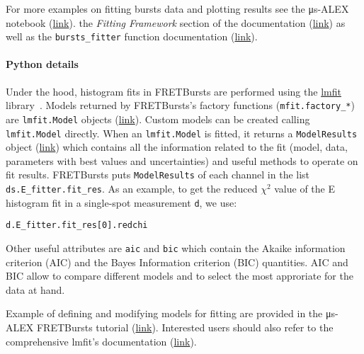 For more examples on fitting bursts data and plotting results see the
μs-ALEX notebook (\href{http://nbviewer.jupyter.org/github/tritemio/FRETBursts_notebooks/blob/master/notebooks/FRETBursts%20-%20us-ALEX%20smFRET%20burst%20analysis.ipynb}{link}).
the \textit{Fitting Framework} section of the documentation 
(\href{http://fretbursts.readthedocs.org/en/latest/fit.html}{link})
as well as the \verb|bursts_fitter| function documentation
(\href{http://fretbursts.readthedocs.org/en/latest/plugins.html#fretbursts.burstlib_ext.bursts_fitter}{link}).

\paragraph{Python details}
Under the hood, histogram fits in FRETBursts are performed using the
\href{http://lmfit.github.io/lmfit-py/}{lmfit} library~\cite{lmfit}.
Models returned by FRETBursts's factory functions (\verb|mfit.factory_*|) 
are \verb|lmfit.Model| objects (\href{https://lmfit.github.io/lmfit-py/model.html}{link}).
Custom models can be created calling \verb|lmfit.Model| directly.
When an \verb|lmfit.Model| is fitted, it returns a \verb|ModelResults| object 
(\href{https://lmfit.github.io/lmfit-py/model.html#the-modelresult-class}{link})
which contains all the information related to the fit (model, data, 
parameters with best values and uncertainties) and useful methods to operate on fit results. 
FRETBursts puts \verb|ModelResults| of each channel in the list 
\verb|ds.E_fitter.fit_res|.
As an example, to get the reduced $\chi^2$ value of the E histogram fit in a 
single-spot measurement \verb|d|, we use:

\begin{lstlisting}
d.E_fitter.fit_res[0].redchi
\end{lstlisting}

Other useful attributes are \verb|aic| and \verb|bic| which contain the 
Akaike information criterion (AIC) and the Bayes Information criterion (BIC)
quantities. AIC and BIC allow to compare different models and
to select the most approriate for the data at hand.

Example of defining and modifying models for fitting are provided in 
the μs-ALEX FRETBursts tutorial (\href{http://nbviewer.jupyter.org/github/tritemio/FRETBursts_notebooks/blob/master/notebooks/FRETBursts%20-%20us-ALEX%20smFRET%20burst%20analysis.ipynb}{link}). 
Interested users should also refer to the comprehensive lmfit's documentation
(\href{http://lmfit.github.io/lmfit-py/}{link}).
